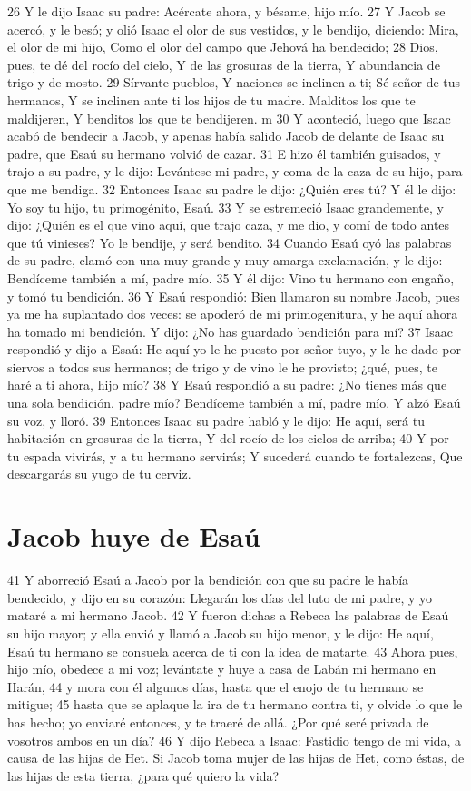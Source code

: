 26 Y le dijo Isaac su padre: Acércate ahora, y bésame, hijo mío.
27 Y Jacob se acercó, y le besó; y olió Isaac el olor de sus vestidos, y le bendijo, diciendo:
    Mira, el olor de mi hijo,
    Como el olor del campo que Jehová ha bendecido;
28 Dios, pues, te dé del rocío del cielo,
Y de las grosuras de la tierra,
Y abundancia de trigo y de mosto.
29 Sírvante pueblos,
Y naciones se inclinen a ti;
Sé señor de tus hermanos,
Y se inclinen ante ti los hijos de tu madre.
Malditos los que te maldijeren,
Y benditos los que te bendijeren. m
30 Y aconteció, luego que Isaac acabó de bendecir a Jacob, y apenas había salido Jacob de delante de Isaac su padre, que Esaú su hermano volvió de cazar.
31 E hizo él también guisados, y trajo a su padre, y le dijo: Levántese mi padre, y coma de la caza de su hijo, para que me bendiga.
32 Entonces Isaac su padre le dijo: ¿Quién eres tú? Y él le dijo: Yo soy tu hijo, tu primogénito, Esaú.
33 Y se estremeció Isaac grandemente, y dijo: ¿Quién es el que vino aquí, que trajo caza, y me dio, y comí de todo antes que tú vinieses? Yo le bendije, y será bendito.
34 Cuando Esaú oyó las palabras de su padre, clamó con una muy grande y muy amarga exclamación, y le dijo: Bendíceme también a mí, padre mío.
35 Y él dijo: Vino tu hermano con engaño, y tomó tu bendición.
36 Y Esaú respondió: Bien llamaron su nombre Jacob, pues ya me ha suplantado dos veces: se apoderó de mi primogenitura, y he aquí ahora ha tomado mi bendición. Y dijo: ¿No has guardado bendición para mí?
37 Isaac respondió y dijo a Esaú: He aquí yo le he puesto por señor tuyo, y le he dado por siervos a todos sus hermanos; de trigo y de vino le he provisto; ¿qué, pues, te haré a ti ahora, hijo mío?
38 Y Esaú respondió a su padre: ¿No tienes más que una sola bendición, padre mío? Bendíceme también a mí, padre mío. Y alzó Esaú su voz, y lloró.
39 Entonces Isaac su padre habló y le dijo:
    He aquí, será tu habitación en grosuras de la tierra,
    Y del rocío de los cielos de arriba;
40 Y por tu espada vivirás, y a tu hermano servirás;
Y sucederá cuando te fortalezcas,
Que descargarás su yugo de tu cerviz.

\section{Jacob huye de Esaú}

41 Y aborreció Esaú a Jacob por la bendición con que su padre le había bendecido, y dijo en su corazón: Llegarán los días del luto de mi padre, y yo mataré a mi hermano Jacob.
42 Y fueron dichas a Rebeca las palabras de Esaú su hijo mayor; y ella envió y llamó a Jacob su hijo menor, y le dijo: He aquí, Esaú tu hermano se consuela acerca de ti con la idea de matarte.
43 Ahora pues, hijo mío, obedece a mi voz; levántate y huye a casa de Labán mi hermano en Harán,
44 y mora con él algunos días, hasta que el enojo de tu hermano se mitigue;
45 hasta que se aplaque la ira de tu hermano contra ti, y olvide lo que le has hecho; yo enviaré entonces, y te traeré de allá. ¿Por qué seré privada de vosotros ambos en un día?
46 Y dijo Rebeca a Isaac: Fastidio tengo de mi vida, a causa de las hijas de Het. Si Jacob toma mujer de las hijas de Het, como éstas, de las hijas de esta tierra, ¿para qué quiero la vida?

